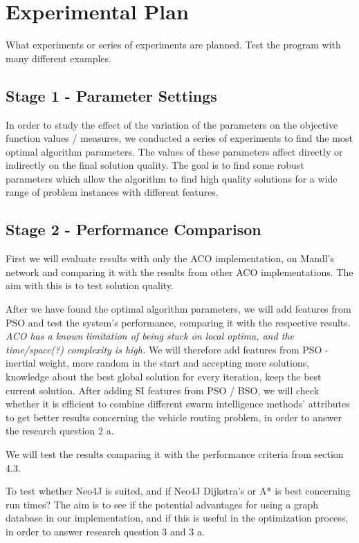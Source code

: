 \section{Experimental Plan}

What experiments or series of experiments are planned. Test the program with many different examples.

\subsection{Stage 1 - Parameter Settings}

In order to study the effect of the variation of the parameters on the objective function values / measures, we conducted a series of experiments to find the most optimal algorithm parameters. The values of these parameters affect directly or indirectly on the final solution quality. The goal is to find some robust parameters which allow the algorithm to find high quality solutions for a wide range of problem instances with different features. 

\subsection{Stage 2 - Performance Comparison}

First we will evaluate results with only the ACO implementation, on Mandl's network and comparing it with the results from other ACO implementations. The aim with this is to test solution quality.

After we have found the optimal algorithm parameters, we will add features from PSO and test the system's performance, comparing it with the respective results. \emph{\color{red}ACO has a known limitation of being stuck on local optima, and the time/space(?) complexity is high.} We will therefore 
add features from PSO - inertial weight, more random in the start and accepting more solutions, knowledge about the best global solution for every iteration, keep the best current solution. After adding SI features from PSO / BSO, we will check whether it is efficient to combine different swarm intelligence methods' attributes to get better results concerning the vehicle routing problem, in order to answer the research question 2 a.

We will test the results comparing it with the performance criteria from section 4.3.

To test whether Neo4J is suited, and if Neo4J Dijkstra's or A* is best concerning run times? The aim is to see if the potential advantages for using a graph database in our implementation, and if this is useful in the optimization process, in order to answer research question 3 and 3 a.


